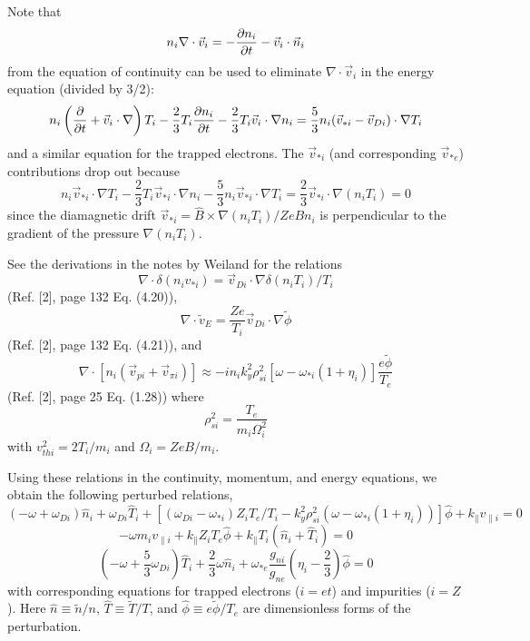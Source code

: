Note that 
\[ n_i \nabla \cdot \vec{v}_i = - \frac{\partial n_i}{\partial t} - \vec{v}_i \cdot \vec{n}_i \]
from the equation of continuity can be used to eliminate
$ \nabla \cdot \vec{v}_i $ in the energy equation (divided by 3/2):
\[ n_i \left( \frac{\partial }{\partial t} + \vec{v}_i \cdot \nabla \right) T_i
-\frac{2}{3} T_i \frac{\partial n_i}{\partial t}
 - \frac{2}{3} T_i \vec{v}_i \cdot \nabla n_i
 = \frac{5}{3} n_i ( \vec{v}_{*i} - \vec{v}_{Di} ) \cdot \nabla T_i \]
and a similar equation for the trapped electrons.
The $\vec{v}_{*i}$ (and corresponding $\vec{v}_{*e}$)
contributions drop out because
\[ n_i \vec{v}_{*i} \cdot \nabla T_i
 - \frac{2}{3} T_i \vec{v}_{*i} \cdot \nabla n_i
 - \frac{5}{3} n_i \vec{v}_{*i} \cdot \nabla T_i
 = \frac{2}{3} \vec{v}_{*i} \cdot \nabla ( n_i T_i ) = 0 \]
since the diamagnetic drift
$ \vec{v}_{*i} = \hat{B} \times \nabla ( n_i T_i ) / ZeB n_i $
is perpendicular to the gradient of the pressure
$ \nabla ( n_i T_i ) $.

See the derivations in the notes by Weiland\cite{weil92a} for
the relations
\[ \nabla \cdot \delta ( {n_i v_{*i}} ) 
 = \vec{v}_{Di} \cdot \nabla \delta ( {n_i T_i} ) / T_i \]
(Ref. [2], page 132 Eq. (4.20)),
\[ \nabla \cdot \tilde{v}_E
   = \frac{Z e}{T_i} \vec{v}_{Di} \cdot \nabla \tilde{\phi} \]
(Ref. [2], page 132 Eq. (4.21)), and
\[ \nabla \cdot [ n_i ( \vec{v}_{pi} + \vec{v}_{\pi i} ) ]
 \approx - i n_i k_y^2 \rho_{si}^2
 [ \omega - \omega_{*i} ( 1 + \eta_i ) ] \frac{e \tilde{\phi}}{T_e} \]
(Ref. [2], page 25 Eq. (1.28)) where
\[ \rho_{si}^2 = \frac{T_e}{m_i \Omega_i^2} \]
with $ v_{thi}^2 = 2 T_i / m_i $ and $ \Omega_i = Z e B / m_i $.

Using these relations in the continuity, momentum, and energy equations, 
we obtain the following perturbed relations,
\[ (-\omega + \omega_{Di}) \hat{n}_i + \omega_{Di} \hat{T}_i
 + [ ( \omega_{Di} - \omega_{*i} ) Z_i T_e/T_i
 - k_y^2 \rho_{si}^2 ( \omega - \omega_{*i} ( 1 + \eta_i ) )
 ] \hat{\phi} + k_\parallel v_{\parallel i} = 0 \]
\[ - \omega m_i v_{\parallel i} + k_\parallel Z_i T_e \hat{\phi}
 + k_\parallel T_i ( \hat{n}_i + \hat{T}_i ) = 0 \]
\[ (-\omega + \frac{5}{3} \omega_{Di} ) \hat{T}_i
   + \frac{2}{3} \omega \hat{n}_i
   + \omega_{*e} \frac{g_{ni}}{g_{ne}}
   ( \eta_i - \frac{2}{3} ) \hat{\phi} = 0 \]
with corresponding equations for trapped electrons ($i=et$)
and impurities ($i=Z$).
Here $\hat{n} \equiv \tilde{n} / n$, 
$\hat{T} \equiv \tilde{T} / T$, and
$\hat{\phi} \equiv e \tilde{\phi} / T_e$ are dimensionless forms
of the perturbation.

